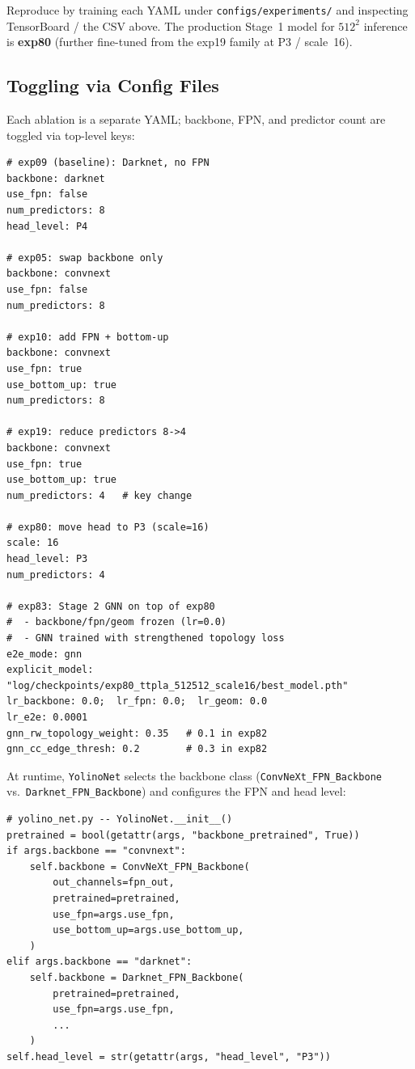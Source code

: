 \documentclass[11pt,a4paper]{article}
\begin{document}
\noindent
Reproduce by training each YAML under \texttt{configs/experiments/} and
inspecting TensorBoard / the CSV above.
The production Stage~1 model for $512^2$ inference is \textbf{exp80}
(further fine-tuned from the exp19 family at P3 / scale~16).

\subsection{Toggling via Config Files}

Each ablation is a separate YAML; backbone, FPN, and predictor count are
toggled via top-level keys:

\begin{lstlisting}
# exp09 (baseline): Darknet, no FPN
backbone: darknet
use_fpn: false
num_predictors: 8
head_level: P4

# exp05: swap backbone only
backbone: convnext
use_fpn: false
num_predictors: 8

# exp10: add FPN + bottom-up
backbone: convnext
use_fpn: true
use_bottom_up: true
num_predictors: 8

# exp19: reduce predictors 8->4
backbone: convnext
use_fpn: true
use_bottom_up: true
num_predictors: 4   # key change

# exp80: move head to P3 (scale=16)
scale: 16
head_level: P3
num_predictors: 4

# exp83: Stage 2 GNN on top of exp80
#  - backbone/fpn/geom frozen (lr=0.0)
#  - GNN trained with strengthened topology loss
e2e_mode: gnn
explicit_model: "log/checkpoints/exp80_ttpla_512512_scale16/best_model.pth"
lr_backbone: 0.0;  lr_fpn: 0.0;  lr_geom: 0.0
lr_e2e: 0.0001
gnn_rw_topology_weight: 0.35   # 0.1 in exp82
gnn_cc_edge_thresh: 0.2        # 0.3 in exp82
\end{lstlisting}

At runtime, \texttt{YolinoNet} selects the backbone class
(\texttt{ConvNeXt\_FPN\_Backbone} vs.\ \texttt{Darknet\_FPN\_Backbone})
and configures the FPN and head level:

\begin{lstlisting}
# yolino_net.py -- YolinoNet.__init__()
pretrained = bool(getattr(args, "backbone_pretrained", True))
if args.backbone == "convnext":
    self.backbone = ConvNeXt_FPN_Backbone(
        out_channels=fpn_out,
        pretrained=pretrained,
        use_fpn=args.use_fpn,
        use_bottom_up=args.use_bottom_up,
    )
elif args.backbone == "darknet":
    self.backbone = Darknet_FPN_Backbone(
        pretrained=pretrained,
        use_fpn=args.use_fpn,
        ...
    )
self.head_level = str(getattr(args, "head_level", "P3"))
\end{lstlisting}
\end{document}
